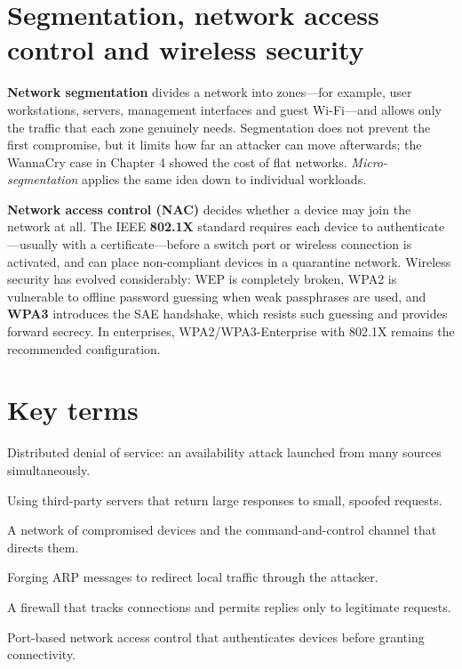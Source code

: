 \documentclass[11pt,openany]{book}
\begin{document}
\section{Segmentation, network access control and wireless security}\label{sec:6.6}
\textbf{Network segmentation} divides a network into zones—for example, user workstations, servers, management interfaces and guest Wi-Fi—and allows only the traffic that each zone genuinely needs. Segmentation does not prevent the first compromise, but it limits how far an attacker can move afterwards; the WannaCry case in Chapter 4 showed the cost of flat networks. \emph{Micro-segmentation} applies the same idea down to individual workloads.

\textbf{Network access control (NAC)} decides whether a device may join the network at all. The IEEE \textbf{802.1X} standard requires each device to authenticate—usually with a certificate—before a switch port or wireless connection is activated, and can place non-compliant devices in a quarantine network. Wireless security has evolved considerably: WEP is completely broken, WPA2 is vulnerable to offline password guessing when weak passphrases are used, and \textbf{WPA3} introduces the SAE handshake, which resists such guessing and provides forward secrecy. In enterprises, WPA2/WPA3-Enterprise with 802.1X remains the recommended configuration.

\section*{Key terms}
\begin{description}[style=nextline,leftmargin=1.2em]
  \item[DDoS] Distributed denial of service: an availability attack launched from many sources simultaneously.
  \item[Amplification] Using third-party servers that return large responses to small, spoofed requests.
  \item[Botnet / C2] A network of compromised devices and the command-and-control channel that directs them.
  \item[ARP spoofing] Forging ARP messages to redirect local traffic through the attacker.
  \item[Stateful firewall] A firewall that tracks connections and permits replies only to legitimate requests.
  \item[802.1X] Port-based network access control that authenticates devices before granting connectivity.
\end{description}
\end{document}
